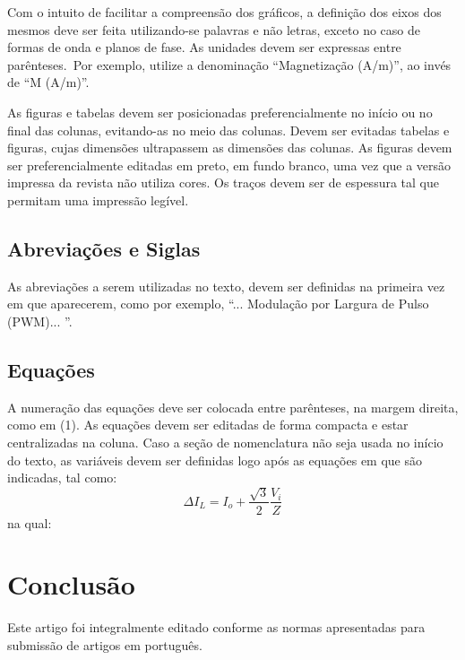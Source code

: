 \documentclass[portugues]{sobraep}
\begin{document}
Com o intuito de facilitar a compreensão dos gráficos, a definição dos eixos dos mesmos deve ser feita utilizando-se palavras e não letras, exceto no caso de formas de onda e planos de fase. As unidades devem ser expressas entre parênteses.~Por exemplo, utilize a denominação ``Magnetização (A/m)'', ao invés de ``M (A/m)''.

As figuras e tabelas devem ser posicionadas preferencialmente no início ou no final das colunas, evitando-as no meio das colunas. Devem ser evitadas tabelas e figuras, cujas dimensões ultrapassem as dimensões das colunas. As figuras devem ser preferencialmente editadas em preto, em fundo branco, uma vez que a versão impressa da revista não utiliza cores. Os traços devem ser de espessura tal que permitam uma impressão legível.
\balance
\subsection{Abreviações e Siglas}

As abreviações a serem utilizadas no texto, devem ser definidas na primeira vez em que aparecerem, como por exemplo, ``... Modulação por Largura de Pulso  (PWM)... ''.

\subsection{Equações}

A numeração das equações deve ser colocada entre parênteses, na margem direita, como em (1). As equações devem ser editadas de forma compacta e estar centralizadas na coluna. Caso a seção de nomenclatura não seja usada no início do texto, as variáveis devem ser definidas logo após as equações em que são indicadas, tal como:
\begin{equation}
	\Delta I_{L}=I_{o}+\frac{\sqrt{3}}{2}\frac{V_{i}}{Z}
\end{equation}
na qual:


\section{Conclusão}
Este artigo foi integralmente editado conforme as normas apresentadas para submissão de artigos em português.
\end{document}
